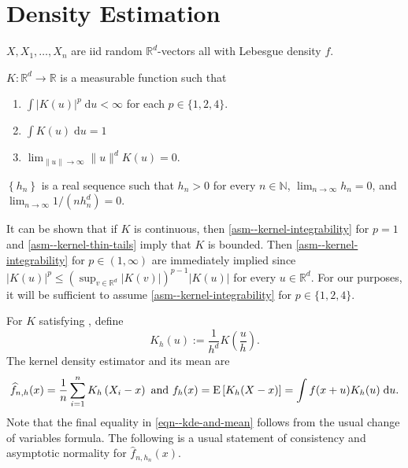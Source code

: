 
\section{Density Estimation}

\begin{assumption}
\label{asm--kde-dgp}
\(X, X_{1}, \dots, X_{n}\) are iid random \(\mathbb{R}^{d}\)-vectors all with
Lebesgue density \(f\).
\end{assumption}

\begin{assumption}
\label{asm--kernel}
\(K : \mathbb{R}^{d} \to \mathbb{R}\) is a measurable function such that
\begin{enumerate}[label=(\roman*)]
  \item
    \label{asm--kernel-integrability}
    \(\int |K (u)|^{p} \; \mathrm{d} u < \infty\) for each \(p \in \{1, 2,
    4\}\).
  \item
    \label{asm--kernel-unit-integral}
    \(\int K (u) \; \mathrm{d} u = 1\)
  \item \label{asm--kernel-thin-tails}
    \(\lim_{\|u\| \to \infty} \|u\|^{d} K (u) = 0\).
\end{enumerate}
\end{assumption}

\begin{assumption}
\label{asm--bandwidth}
\(\left\{ h_{n} \right\}\) is a real sequence such that \(h_{n} > 0\) for every
\(n \in \mathbb{N}\), \(\lim_{n \to \infty} h_{n} = 0\), and \(\lim_{n \to
\infty} 1 / \left( n h_{n}^{d} \right) = 0\).
\end{assumption}

\begin{remark}
It can be shown that if \(K\) is continuous, then
 \ref{asm--kernel-integrability} for \(p = 1\) and
\ref{asm--kernel-thin-tails} imply that \(K\) is bounded.
Then  \ref{asm--kernel-integrability} for \(p \in (1,
\infty)\) are immediately implied since \(|K (u)|^{p} \leq \left( \sup_{v \in
\mathbb{R}^{d}} |K (v)| \right)^{p - 1}
|K (u)|\) for every \(u \in \mathbb{R}^{d}\).
For our purposes, it will be sufficient to assume 
\ref{asm--kernel-integrability} for \(p \in \{1, 2, 4\}\).
\end{remark}

For \(K\) satisfying , define
\begin{equation}
  K_{h} (u) := \frac{1}{h^{d}} K \left( \frac{u}{h} \right).
  \label{eqn--kernel-Kh}
\end{equation}
The kernel density estimator and its mean are
\begin{equation}
  \widehat{f}_{n, h} (x) = \frac{1}{n} \sum_{i = 1}^{n} K_{h} \left( X_{i} - x
  \right) \text{ and } f_{h} (x) = \mathrm{E} \left[ K_{h} (X - x) \right] = \int f (x +
  u) K_{h} (u) \; \mathrm{d} u.
  \label{eqn--kde-and-mean}
\end{equation}
Note that the final equality in \eqref{eqn--kde-and-mean} follows from the usual
change of variables formula.
The following is a usual statement of consistency and asymptotic normality for
\(\widehat{f}_{n, h_{n}} (x)\).

